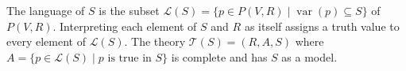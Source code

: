 The language of $S$ is the subset $\mathcal{L}(S) = \{p \in P(V, R) \mid \operatorname{var}(p) \subseteq S\}$ of $P(V, R)$. Interpreting each element of $S$ and $R$ as itself assigns a truth value to every element of $\mathcal{L}(S)$. The theory $\mathcal{T}(S) = (R, A, S)$ where $A = \{p \in \mathcal{L}(S) \mid p \text{ is true in } S\}$ is complete and has $S$ as a model.
